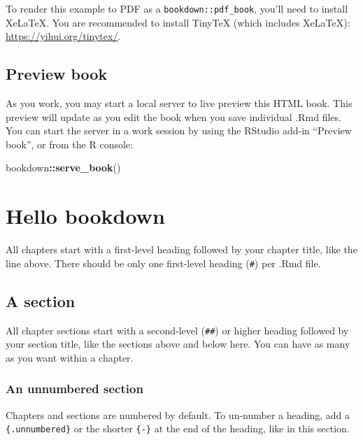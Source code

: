 \documentclass[
]{book}
\newenvironment{Shaded}{\begin{snugshade}}{\end{snugshade}}
\newcommand{\FunctionTok}[1]{\textcolor[rgb]{0.13,0.29,0.53}{\textbf{#1}}}
\newcommand{\NormalTok}[1]{#1}
\newcommand{\SpecialCharTok}[1]{\textcolor[rgb]{0.81,0.36,0.00}{\textbf{#1}}}
\theoremstyle{definition}
\theoremstyle{definition}
\theoremstyle{definition}
\theoremstyle{definition}
\theoremstyle{remark}
\begin{document}
To render this example to PDF as a \texttt{bookdown::pdf\_book}, you'll need to install XeLaTeX. You are recommended to install TinyTeX (which includes XeLaTeX): \url{https://yihui.org/tinytex/}.

\hypertarget{preview-book}{%
\section{Preview book}\label{preview-book}}

As you work, you may start a local server to live preview this HTML book. This preview will update as you edit the book when you save individual .Rmd files. You can start the server in a work session by using the RStudio add-in ``Preview book'', or from the R console:

\begin{Shaded}
\begin{Highlighting}[]
\NormalTok{bookdown}\SpecialCharTok{::}\FunctionTok{serve\_book}\NormalTok{()}
\end{Highlighting}
\end{Shaded}

\hypertarget{hello-bookdown}{%
\chapter{Hello bookdown}\label{hello-bookdown}}

All chapters start with a first-level heading followed by your chapter title, like the line above. There should be only one first-level heading (\texttt{\#}) per .Rmd file.

\hypertarget{a-section}{%
\section{A section}\label{a-section}}

All chapter sections start with a second-level (\texttt{\#\#}) or higher heading followed by your section title, like the sections above and below here. You can have as many as you want within a chapter.

\hypertarget{an-unnumbered-section}{%
\subsection*{An unnumbered section}\label{an-unnumbered-section}}

Chapters and sections are numbered by default. To un-number a heading, add a \texttt{\{.unnumbered\}} or the shorter \texttt{\{-\}} at the end of the heading, like in this section.
\end{document}
